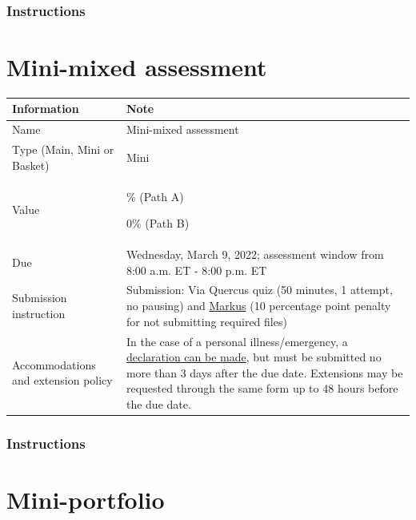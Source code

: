 \documentclass[
  openany]{book}
\begin{document}
\hypertarget{instructions-1}{%
\subsection{Instructions}\label{instructions-1}}

\hypertarget{mini-mixed-assessment}{%
\chapter{Mini-mixed assessment}\label{mini-mixed-assessment}}

\begin{longtable}[]{@{}
  >{\raggedright\arraybackslash}p{}
  >{\raggedright\arraybackslash}p{}@{}}
\toprule
\textbf{Information} & \textbf{Note} \\
\midrule
\endhead
Name & Mini-mixed assessment \\
Type (Main, Mini or Basket) & Mini \\
Value & 5\% (Path A)

0\% (Path B) \\
Due & Wednesday, March 9, 2022; assessment window from 8:00 a.m. ET - 8:00 p.m. ET \\
Submission instruction & Submission: Via Quercus quiz (50 minutes, 1 attempt, no pausing) and \href{https://markus-ds.teach.cs.toronto.edu/}{Markus} (10 percentage point penalty for not submitting required files) \\
Accommodations and extension policy & In the case of a personal illness/emergency, a \href{https://forms.office.com/Pages/ResponsePage.aspx?id=JsKqeAMvTUuQN7RtVsVSEOKHUU3SzAJJhmOKjJhDWEpUNTFDSzhZTFlXUzVYMVlNM1FEUTRZMkVWOC4u}{declaration can be made}, but must be submitted no more than 3 days after the due date. Extensions may be requested through the same form up to 48 hours before the due date. \\
\bottomrule
\end{longtable}

\hypertarget{instructions-2}{%
\subsection{Instructions}\label{instructions-2}}

\hypertarget{mini-portfolio-1}{%
\chapter{Mini-portfolio}\label{mini-portfolio-1}}
\end{document}
